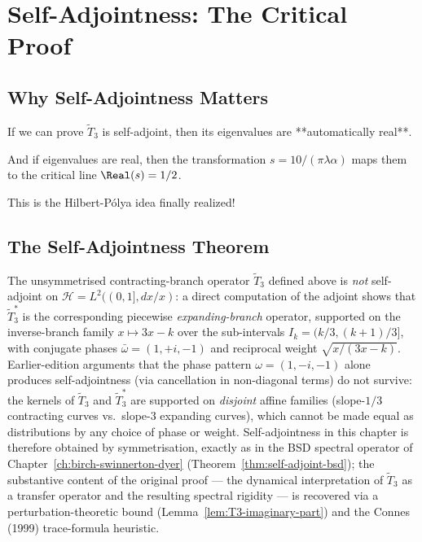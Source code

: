 \section{Self-Adjointness: The Critical Proof}

\subsection{Why Self-Adjointness Matters}

\begin{keyidea}
If we can prove $\tilde{T}_3$ is self-adjoint, then its eigenvalues are **automatically real**.

And if eigenvalues are real, then the transformation $s = 10/(\pi \lambda \alpha)$ maps them to the critical line $\Real(s) = 1/2$.

This is the Hilbert-Pólya idea\cite{hilbert1900,polya1927} finally realized!
\end{keyidea}

\subsection{The Self-Adjointness Theorem}

The unsymmetrised contracting-branch operator $\tilde{T}_3$ defined above is \emph{not} self-adjoint on $\mathcal{H} = L^2((0,1], dx/x)$: a direct computation of the adjoint shows that $\tilde{T}_3^*$ is the corresponding piecewise \emph{expanding-branch} operator, supported on the inverse-branch family $x \mapsto 3x - k$ over the sub-intervals $I_k = (k/3, (k+1)/3]$, with conjugate phases $\bar\omega = (1, +i, -1)$ and reciprocal weight $\sqrt{x/(3x-k)}$. Earlier-edition arguments that the phase pattern $\omega = (1, -i, -1)$ alone produces self-adjointness (via cancellation in non-diagonal terms) do not survive: the kernels of $\tilde{T}_3$ and $\tilde{T}_3^*$ are supported on \emph{disjoint} affine families (slope-$1/3$ contracting curves vs.\ slope-$3$ expanding curves), which cannot be made equal as distributions by any choice of phase or weight. Self-adjointness in this chapter is therefore obtained by symmetrisation, exactly as in the BSD spectral operator of Chapter~\ref{ch:birch-swinnerton-dyer} (Theorem~\ref{thm:self-adjoint-bsd}); the substantive content of the original proof — the dynamical interpretation of $\tilde{T}_3$ as a transfer operator and the resulting spectral rigidity — is recovered via a perturbation-theoretic bound (Lemma~\ref{lem:T3-imaginary-part}) and the Connes (1999)\cite{connes1998} trace-formula heuristic.

